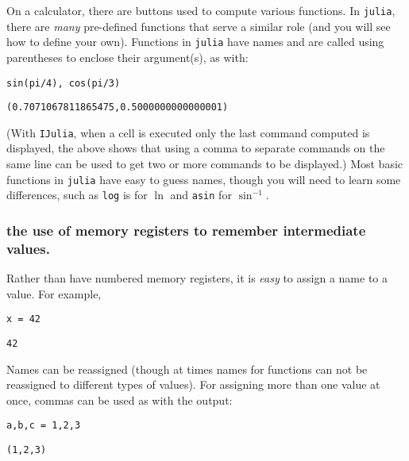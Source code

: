 \documentclass[12pt]{article}
\begin{document}
On a calculator, there are buttons used to compute various functions. In \texttt{julia}, there are \textit{many} pre-defined functions that serve a similar role (and you will see how to define your own). Functions in \texttt{julia} have names and are called using parentheses to enclose their argument(s), as with:\begin{verbatim}
sin(pi/4), cos(pi/3)
\end{verbatim}
\begin{verbatim}
(0.7071067811865475,0.5000000000000001)\end{verbatim}
\newline
(With \texttt{IJulia}, when a cell is executed only the last command computed is displayed, the above shows that using a comma to separate commands on the same line can be used to get two or more commands to be displayed.)\newline
Most basic functions in \texttt{julia} have easy to guess names, though you will need to learn some differences, such as \texttt{log} is for $\ln$ and \texttt{asin} for $\sin^{-1}$.\subsubsection{the use of memory registers to remember intermediate values.}\newline
Rather than have numbered memory registers, it is \textit{easy} to assign a name to a value. For example,\begin{verbatim}
x = 42
\end{verbatim}
\begin{verbatim}
42\end{verbatim}
\newline
Names can be reassigned (though at times names for functions can not be reassigned to different types of values). For assigning more than one value at once, commas can be used as with the output:\begin{verbatim}
a,b,c = 1,2,3
\end{verbatim}
\begin{verbatim}
(1,2,3)\end{verbatim}
\end{document}
